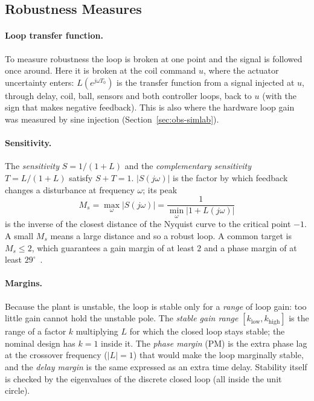\documentclass[11pt,a4paper]{article}
\begin{document}
\subsection{Robustness Measures}
\label{sec:th-robust}
\paragraph{Loop transfer function.} To measure robustness the loop is broken at one point and the signal is
followed once around. Here it is broken at the coil command $u$, where the actuator uncertainty enters: $L(e^{j\omega T_0})$
is the transfer function from a signal injected at $u$, through delay, coil, ball, sensors and both controller loops, back
to $u$ (with the sign that makes negative feedback). This is also where the hardware loop gain was measured by sine
injection (Section~\ref{sec:obs-simlab}).

\paragraph{Sensitivity.} The \emph{sensitivity} $S = 1/(1+L)$ and the \emph{complementary sensitivity}
$T = L/(1+L)$ satisfy $S+T=1$. $|S(j\omega)|$ is the factor by which feedback changes a disturbance at frequency $\omega$;
its peak
\begin{equation}
M_s = \max_\omega |S(j\omega)| = \frac{1}{\min_\omega |1 + L(j\omega)|}
\label{eq:ms}
\end{equation}
is the inverse of the closest distance of the Nyquist curve to the critical point $-1$. A small $M_s$ means a large
distance and so a robust loop. A common target is $M_s \le 2$, which guarantees a gain margin of at least $2$ and a phase
margin of at least $29^\circ$~\cite{skogestad}.

\paragraph{Margins.} Because the plant is unstable, the loop is stable only for a \emph{range} of loop gain: too little gain
cannot hold the unstable pole. The \emph{stable gain range} $[k_{\mathrm{low}},k_{\mathrm{high}}]$ is the range of a factor $k$
multiplying $L$ for which the closed loop stays stable; the nominal design has $k=1$ inside it. The \emph{phase margin} (PM)
is the extra phase lag at the crossover frequency ($|L|=1$) that would make the loop marginally stable, and the
\emph{delay margin} is the same expressed as an extra time delay. Stability itself is checked by the eigenvalues of the
discrete closed loop (all inside the unit circle).
\end{document}
